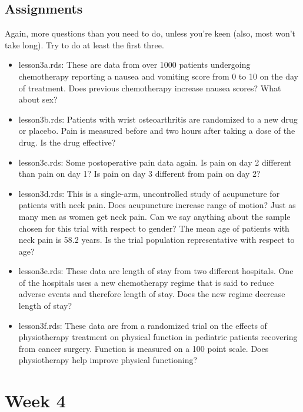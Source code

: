\documentclass[]{book}
\providecommand{\tightlist}{%
  \setlength{\itemsep}{0pt}\setlength{\parskip}{0pt}}
\begin{document}
\hypertarget{assignments-2}{%
\section{Assignments}\label{assignments-2}}

Again, more questions than you need to do, unless you're keen (also,
most won't take long). Try to do at least the first three.

\begin{itemize}
\tightlist
\item
  lesson3a.rds: These are data from over 1000 patients undergoing
  chemotherapy reporting a nausea and vomiting score from 0 to 10 on the
  day of treatment. Does previous chemotherapy increase nausea scores?
  What about sex?
\item
  lesson3b.rds: Patients with wrist osteoarthritis are randomized to a
  new drug or placebo. Pain is measured before and two hours after
  taking a dose of the drug. Is the drug effective?
\item
  lesson3c.rds: Some postoperative pain data again. Is pain on day 2
  different than pain on day 1? Is pain on day 3 different from pain on
  day 2?
\item
  lesson3d.rds: This is a single-arm, uncontrolled study of acupuncture
  for patients with neck pain. Does acupuncture increase range of
  motion? Just as many men as women get neck pain. Can we say anything
  about the sample chosen for this trial with respect to gender? The
  mean age of patients with neck pain is 58.2 years. Is the trial
  population representative with respect to age?
\item
  lesson3e.rds: These data are length of stay from two different
  hospitals. One of the hospitals uses a new chemotherapy regime that is
  said to reduce adverse events and therefore length of stay. Does the
  new regime decrease length of stay?
\item
  lesson3f.rds: These data are from a randomized trial on the effects of
  physiotherapy treatment on physical function in pediatric patients
  recovering from cancer surgery. Function is measured on a 100 point
  scale. Does physiotherapy help improve physical functioning?
\end{itemize}

\hypertarget{week-4}{%
\chapter{Week 4}\label{week-4}}
\end{document}
